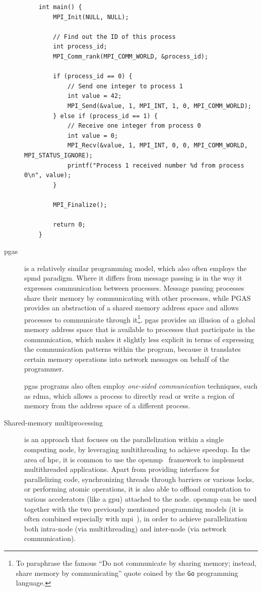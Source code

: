 \begin{description}
\begin{listing}[h]
\begin{verbatim}
	int main() {
		MPI_Init(NULL, NULL);

		// Find out the ID of this process
		int process_id;
		MPI_Comm_rank(MPI_COMM_WORLD, &process_id);

		if (process_id == 0) {
			// Send one integer to process 1
			int value = 42;
			MPI_Send(&value, 1, MPI_INT, 1, 0, MPI_COMM_WORLD);
		} else if (process_id == 1) {
			// Receive one integer from process 0
			int value = 0;
			MPI_Recv(&value, 1, MPI_INT, 0, 0, MPI_COMM_WORLD, MPI_STATUS_IGNORE);
			printf("Process 1 received number %d from process 0\n", value);
		}

		MPI_Finalize();

		return 0;
	}
				  \end{verbatim}
		\end{listing}

	\item[\gls{pgas}~\cite{pgas}] is a relatively similar programming model, which also often employs the \gls{spmd}
		paradigm. Where it differs from message passing is in the way it expresses communication between
		processes. Message passing processes share their memory by communicating with other processes,
		while PGAS provides an abstraction of a shared memory address space and allows processes to
		communicate through it\footnote{To paraphrase the famous ``Do not communicate by sharing memory; instead, share memory by communicating'' quote coined by the \texttt{Go} programming
		language.}. \gls{pgas} provides an illusion
		of a global memory address space that is available to processes that participate in the
		communication, which makes it slightly less explicit in terms of expressing the communication
		patterns within the program, because it translates certain memory operations into network messages
		on behalf of the programmer.

		\gls{pgas} programs also often employ \emph{one-sided communication} techniques, such
		as \gls{rdma}, which allows a process to directly read or write a region of memory
		from the address space of a different process.

	\item[Shared-memory multiprocessing] is an approach that focuses on the parallelization within a single computing node, by leveraging
		multithreading to achieve speedup. In the area of \gls{hpc}, it is common to use
		the \gls{openmp}~\cite{openmp} framework to implement multithreaded
		applications. Apart from providing interfaces for parallelizing code, synchronizing threads through
		barriers or various locks, or performing atomic operations, it is also able to offload computation
		to various accelerators (like a \gls{gpu}) attached to the node.
		\gls{openmp} can be used together with the two previously mentioned programming
		models (it is often combined especially with
		\gls{mpi}~\cite{hybrid_openmp_mpi}), in order to achieve parallelization both
		intra-node (via multithreading) and inter-node (via network communication).


\end{description}
